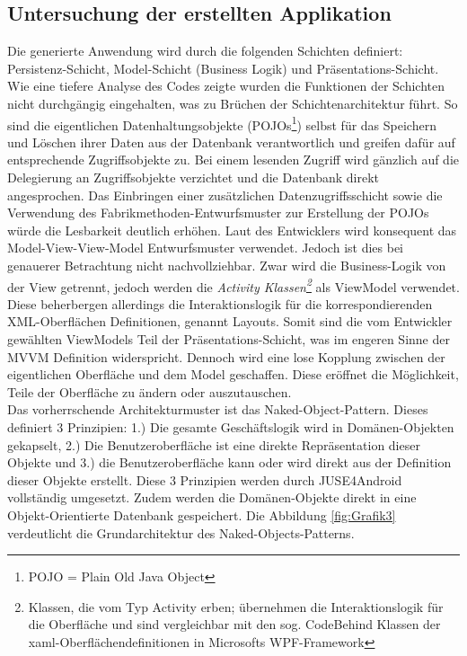 \documentclass[a4paper,twoside]{article}
\begin{document}
\subsection{Untersuchung der erstellten Applikation}
\label{untApp}
Die generierte Anwendung wird durch die folgenden Schichten definiert: Persistenz-Schicht, Model-Schicht (Business Logik) und Präsentations-Schicht. Wie eine tiefere Analyse des Codes zeigte wurden die Funktionen der Schichten nicht durchgängig eingehalten, was zu Brüchen der Schichtenarchitektur führt. So sind die eigentlichen Datenhaltungsobjekte (POJOs\footnote{POJO = Plain Old Java Object}) selbst für das Speichern und Löschen ihrer Daten aus der Datenbank verantwortlich und greifen dafür auf entsprechende Zugriffsobjekte zu. Bei einem lesenden Zugriff wird gänzlich auf die De­le­gie­rung an Zugriffsobjekte verzichtet und die Datenbank direkt angesprochen. Das Einbringen einer zusätzlichen Datenzugriffsschicht sowie die Verwendung des Fabrikmethoden-Entwurfsmuster zur Erstellung der POJOs würde die Lesbarkeit deutlich erhöhen. %
Laut des Entwicklers wird konsequent das Model-View-View-Model Entwurfsmuster verwendet. Jedoch ist dies bei genauerer Betrachtung nicht nachvollziehbar. Zwar wird die Business-Logik von der View getrennt, jedoch werden die \textit{Activity Klassen\footnote{Klassen, die vom Typ Activity erben; übernehmen die Interaktionslogik für die Oberfläche und sind vergleichbar mit den sog. CodeBehind Klassen der xaml-Oberflächendefinitionen in Microsofts WPF-Framework }} als ViewModel verwendet. Diese beherbergen allerdings die Interaktionslogik für die korrespondierenden XML-Oberflächen Definitionen, genannt Layouts. Somit sind die vom Entwickler gewählten ViewModels Teil der Präsentations-Schicht, was im engeren Sinne der MVVM Definition widerspricht.
Dennoch wird eine lose Kopplung zwischen der eigentlichen Oberfläche und dem Model geschaffen. Diese eröffnet die Möglichkeit, Teile der Oberfläche zu ändern oder auszutauschen.\\
Das vorherrschende Architekturmuster ist das Naked-Object-Pattern. Dieses definiert 3 Prinzipien: 1.) Die gesamte Geschäftslogik wird in Domänen-Objekten gekapselt, 2.) Die Benutzeroberfläche ist eine direkte Repräsentation dieser Objekte und 3.) die Benutzeroberfläche kann oder wird direkt aus der Definition dieser Objekte erstellt. Diese 3 Prinzipien werden durch JUSE4Android vollständig umgesetzt. Zudem werden die Domänen-Objekte direkt in eine Objekt-Orientierte Datenbank gespeichert. Die Abbildung \ref{fig:Grafik3} verdeutlicht die Grundarchitektur des Naked-Objects-Patterns.\\
\end{document}

